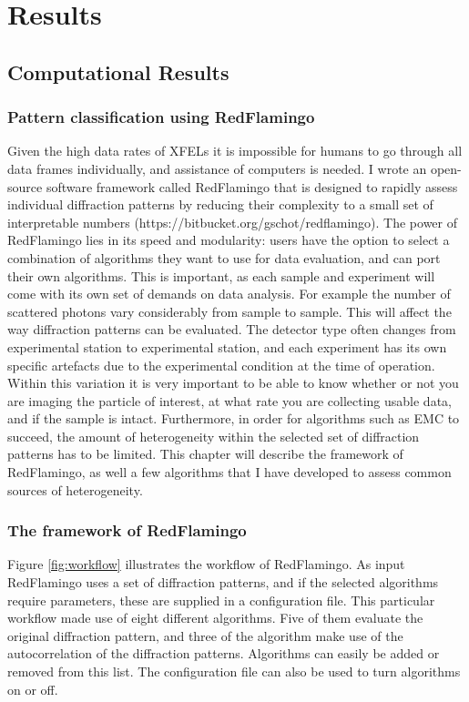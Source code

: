\part{Results}
\chapter{Computational Results}

\section{Pattern classification using RedFlamingo}
Given the high data rates of XFELs it is impossible for humans to go through all data frames individually, and assistance of computers is needed. I wrote an open-source software framework called RedFlamingo that is designed to rapidly assess individual diffraction patterns by reducing their complexity to a small set of interpretable numbers (https://bitbucket.org/gschot/redflamingo). The power of RedFlamingo lies in its speed and modularity: users have the option to select a combination of algorithms they want to use for data evaluation, and can port their own algorithms. This is important, as each sample and experiment will come with its own set of demands on data analysis. For example the number of scattered photons vary considerably from sample to sample. This will affect the way diffraction patterns can be evaluated. The detector type often changes from experimental station to experimental station, and each experiment has its own specific artefacts due to the experimental condition at the time of operation. Within this variation it is very important to be able to know whether or not you are imaging the particle of interest, at what rate you are collecting usable data, and if the sample is intact. Furthermore, in order for algorithms such as EMC to succeed, the amount of heterogeneity within the selected set of diffraction patterns has to be limited. This chapter will describe the framework of RedFlamingo, as well a few algorithms that I have developed to assess common sources of heterogeneity.

\section{The framework of RedFlamingo}
Figure \ref{fig:workflow} illustrates the workflow of RedFlamingo. As input RedFlamingo uses a set of diffraction patterns, and if the selected algorithms require parameters, these are supplied in a configuration file. This particular workflow made use of eight different algorithms. Five of them evaluate the original diffraction pattern, and three of the algorithm make use of the autocorrelation of the diffraction patterns. Algorithms can easily be added or removed from this list. The configuration file can also be used to turn algorithms on or off. 

